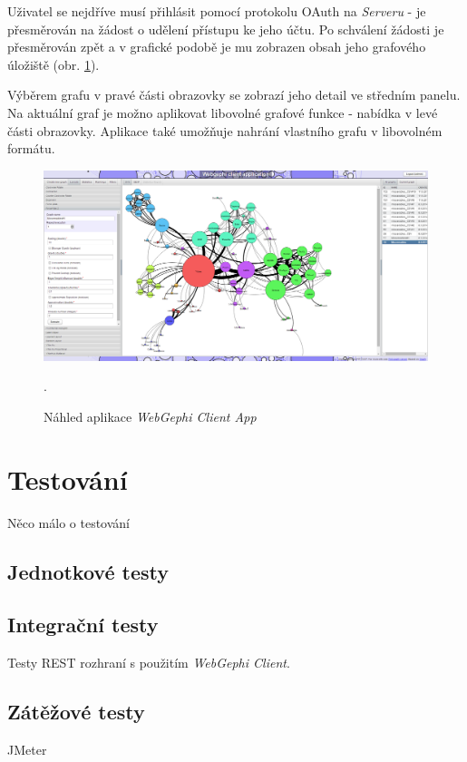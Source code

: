 \documentclass[thesis=M,czech]{FITthesis}[2014/05/6]
\begin{document}
Uživatel se nejdříve musí přihlásit pomocí protokolu OAuth na \textit{Serveru} - je přesměrován na žádost o udělení přístupu ke jeho účtu. Po schválení žádosti je
přesměrován zpět a v grafické podobě je mu zobrazen obsah jeho grafového úložiště (obr. \ref{fig:clientapp-overview}). 

Výběrem grafu v pravé části obrazovky se zobrazí jeho detail ve středním panelu. Na aktuální graf je možno aplikovat libovolné grafové funkce - nabídka v levé části obrazovky.
Aplikace také umožňuje nahrání vlastního grafu v libovolném formátu. 

\begin{figure}\centering
 	\includegraphics[width=1\textwidth]{images/prtsc/clientapp-overview}
 	\caption[Náhled aplikace \textit{WebGephi Client App}]{Náhled aplikace \textit{WebGephi Client App}}.\label{fig:clientapp-overview}
\end{figure}

\chapter{Testování}
Něco málo o testování

\section{Jednotkové testy}

\section{Integrační testy}
Testy REST rozhraní s použitím \textit{WebGephi Client}.

\section{Zátěžové testy}
JMeter
\end{document}
